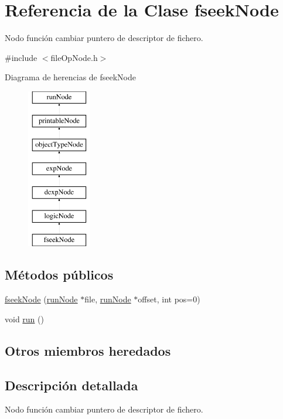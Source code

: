 \hypertarget{classfseekNode}{\section{Referencia de la Clase fseek\-Node}
\label{classfseekNode}
}


Nodo función cambiar puntero de descriptor de fichero.  




{\ttfamily \#include $<$file\-Op\-Node.\-h$>$}

Diagrama de herencias de fseek\-Node\begin{figure}[H]
\begin{center}
\leavevmode
\includegraphics[height=7.000000cm]{classfseekNode}
\end{center}
\end{figure}
\subsection*{Métodos públicos}
\begin{DoxyCompactItemize}
\item 
\hyperlink{classfseekNode_a15a163ad45fe50710ce3a9b2c7032160}{fseek\-Node} (\hyperlink{classrunNode}{run\-Node} $\ast$file, \hyperlink{classrunNode}{run\-Node} $\ast$offset, int pos=0)
\item 
void \hyperlink{classfseekNode_aec2f6985f9df3761c36d063d7d32b59c}{run} ()
\end{DoxyCompactItemize}
\subsection*{Otros miembros heredados}


\subsection{Descripción detallada}
Nodo función cambiar puntero de descriptor de fichero. 

